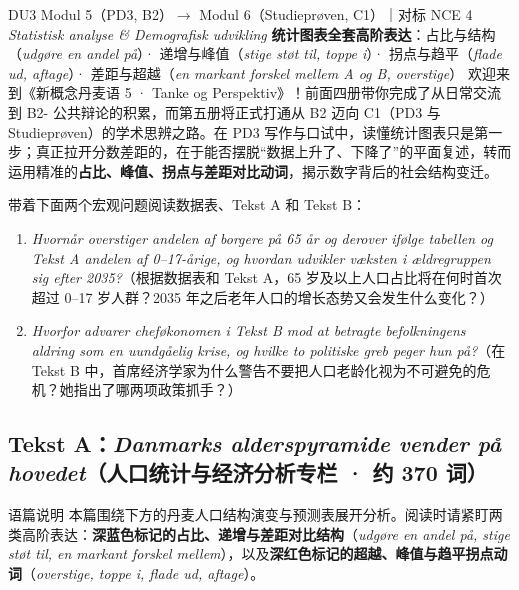 {DU3 Modul 5（PD3, B2）$\rightarrow$ Modul 6（Studieprøven, C1）｜对标 NCE 4 \textit{Statistisk analyse \& Demografisk udvikling}}
{\textbf{统计图表全套高阶表达}：占比与结构（\textit{udgøre en andel på}）· 递增与峰值（\textit{stige støt til, toppe i}）· 拐点与趋平（\textit{flade ud, aftage}）· 差距与超越（\textit{en markant forskel mellem A og B, overstige}）}
{欢迎来到《新概念丹麦语 5 · Tanke og Perspektiv》！前面四册带你完成了从日常交流到 B2- 公共辩论的积累，而第五册将正式打通从 B2 迈向 C1（PD3 与 Studieprøven）的学术思辨之路。在 PD3 写作与口试中，读懂统计图表只是第一步；真正拉开分数差距的，在于能否摆脱“数据上升了、下降了”的平面复述，转而运用精准的\textbf{占比、峰值、拐点与差距对比动词}，揭示数字背后的社会结构变迁。}

\begin{foerduleaeser}
带着下面两个宏观问题阅读数据表、Tekst A 和 Tekst B：
\begin{enumerate}
  \item \textit{Hvornår overstiger andelen af borgere på 65 år og derover ifølge tabellen og Tekst A andelen af 0--17-årige, og hvordan udvikler væksten i ældregruppen sig efter 2035?}（根据数据表和 Tekst A，65 岁及以上人口占比将在何时首次超过 0--17 岁人群？2035 年之后老年人口的增长态势又会发生什么变化？）
  \item \textit{Hvorfor advarer cheføkonomen i Tekst B mod at betragte befolkningens aldring som en uundgåelig krise, og hvilke to politiske greb peger hun på?}（在 Tekst B 中，首席经济学家为什么警告不要把人口老龄化视为不可避免的危机？她指出了哪两项政策抓手？）
\end{enumerate}
\end{foerduleaeser}


\subsection*{Tekst A：\textit{Danmarks alderspyramide vender på hovedet}（人口统计与经济分析专栏 · 约 370 词）}

\begin{tipbox}{语篇说明}
本篇围绕下方的丹麦人口结构演变与预测表展开分析。阅读时请紧盯两类高阶表达：\textbf{\color{NCDNavy}深蓝色标记的占比、递增与差距对比结构}（\textit{udgøre en andel på, stige støt til, en markant forskel mellem}），以及\textbf{\color{NCDRed}深红色标记的超越、峰值与趋平拐点动词}（\textit{overstige, toppe i, flade ud, aftage}）。
\end{tipbox}

